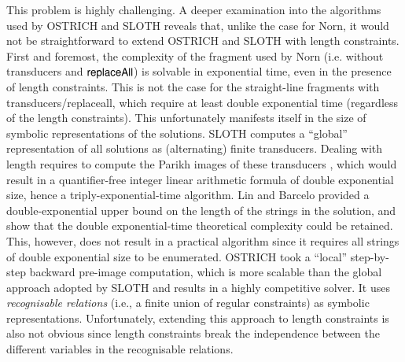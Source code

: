 This problem is highly challenging. A deeper examination into the algorithms used by OSTRICH and SLOTH reveals that,
unlike the case for Norn, it would not be straightforward to extend OSTRICH and 
SLOTH with length constraints. First and foremost, the complexity of the
fragment used by Norn (i.e. without transducers and $\mathsf{replaceAll}$) is solvable
in exponential time, even in the presence of length constraints. This is not
the case for the straight-line fragments with transducers/replaceall, which 
require at least double exponential time (regardless of the length constraints).
This unfortunately manifests itself in the size of symbolic representations of 
the solutions. SLOTH \cite{HJLRV18} computes a ``global''  representation of all
solutions as (alternating) finite transducers. Dealing with length requires to compute the Parikh images of these transducers \cite{LB16}, which would 
result in a
quantifier-free integer linear arithmetic formula of double exponential size, %
hence a triply-exponential-time algorithm.
Lin and Barcelo \cite{LB16} provided a double-exponential upper bound on the 
length of the strings in the solution, and show that the double
exponential-time theoretical complexity could be retained. This, however, does
not result in a practical algorithm since it requires all strings of double
exponential size to be enumerated. OSTRICH \cite{CHL+19} took a ``local''
step-by-step backward pre-image computation, which is more scalable than
the global approach adopted by SLOTH and results in a highly competitive solver.
It uses \emph{recognisable relations} (i.e., a finite union of regular constraints)
as symbolic representations. Unfortunately, extending this approach to length
constraints is also not obvious since length constraints break the independence
between the different variables in the recognisable relations.




